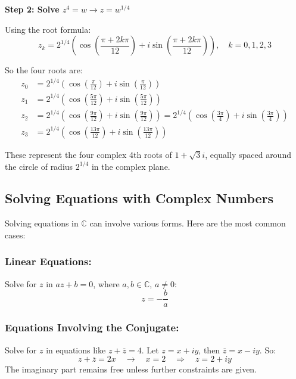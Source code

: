 \textbf{Step 2: Solve \( z^4 = w \to z = w^{1/4} \)}

Using the root formula:
\[
	z_k = 2^{1/4} \left( \cos\left( \frac{\pi + 2k\pi}{12} \right) + i \sin\left( \frac{\pi + 2k\pi}{12} \right) \right), \quad k = 0, 1, 2, 3
\]

So the four roots are:
\begin{align*}
	z_0 & = 2^{1/4} \left( \cos\left( \frac{\pi}{12} \right) + i \sin\left( \frac{\pi}{12} \right) \right)                                                                                                    \\
	z_1 & = 2^{1/4} \left( \cos\left( \frac{5\pi}{12} \right) + i \sin\left( \frac{5\pi}{12} \right) \right)                                                                                                  \\
	z_2 & = 2^{1/4} \left( \cos\left( \frac{9\pi}{12} \right) + i \sin\left( \frac{9\pi}{12} \right) \right) = 2^{1/4} \left( \cos\left( \frac{3\pi}{4} \right) + i \sin\left( \frac{3\pi}{4} \right) \right) \\
	z_3 & = 2^{1/4} \left( \cos\left( \frac{13\pi}{12} \right) + i \sin\left( \frac{13\pi}{12} \right) \right)
\end{align*}

These represent the four complex 4th roots of \( 1 + \sqrt{3}i \), equally spaced around the circle of radius \( 2^{1/4} \) in the complex plane.

\subsection{Solving Equations with Complex Numbers}

Solving equations in \( \mathbb{C} \) can involve various forms. Here are the most common cases:

\subsubsection{Linear Equations:}

Solve for \( z \) in \( az + b = 0 \), where \( a, b \in \mathbb{C} \), \( a \neq 0 \):
	      \[
		      z = -\frac{b}{a}
	      \]

\subsubsection{Equations Involving the Conjugate:}

Solve for \( z \) in equations like \( z + \overline{z} = 4 \).
	      Let \( z = x + iy \), then \( \overline{z} = x - iy \). So:
	      \[
		      z + \overline{z} = 2x \quad \to \quad x = 2 \quad \Rightarrow \quad z = 2 + iy
	      \]
	      The imaginary part remains free unless further constraints are given.

